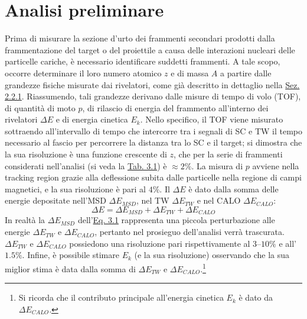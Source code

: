 \documentclass[12pt,a4paper,twoside]{report}
\begin{document}
	\section{Analisi preliminare}\label{sec:fragment_identification}
	Prima di misurare la sezione d'urto dei frammenti secondari prodotti dalla frammentazione del target o del proiettile a causa delle interazioni nucleari delle particelle cariche, è necessario identificare suddetti frammenti. A tale scopo, occorre determinare il loro numero atomico $z$ e di massa $A$ a partire dalle grandezze fisiche misurate dai rivelatori, come già descritto in dettaglio nella \hyperref[sec:setupElettronico]{Sez. 2.2.1}. Riassumendo, tali grandezze derivano dalle misure di tempo di volo (TOF), di quantità di moto $p$, di rilascio di energia del frammento all'interno dei rivelatori $\Delta E$ e di energia cinetica $E_k$. Nello specifico, il TOF viene misurato sottraendo all'intervallo di tempo che intercorre tra i segnali di SC e TW il tempo necessario al fascio per percorrere la distanza tra lo SC e il target; si dimostra che la sua risoluzione è una funzione crescente di $z$, che per la serie di frammenti considerati nell'analisi (si veda la \hyperref[tab:fragments]{Tab. 3.1}) è $\approx2\%$. La misura di $p$ avviene nella tracking region grazie alla deflessione subita dalle particelle nella regione di campi magnetici, e la sua risoluzione è pari al $4\%$. Il $\Delta E$ è dato dalla somma delle energie depositate nell'MSD $\Delta E_{MSD}$, nel TW $\Delta E_{TW}$ e nel CALO $\Delta E_{CALO}$:
	\begin{equation}
		\Delta E=\Delta E_{MSD}+\Delta E_{TW}+\Delta E_{CALO}
		\label{eq:deposited_energy}
	\end{equation}
	In realtà la $\Delta E_{MSD}$ dell'\hyperref[eq:deposited_energy]{Eq. 3.1} rappresenta una piccola perturbazione alle energie $\Delta E_{TW}$ e $\Delta E_{CALO}$, pertanto nel prosieguo dell'analisi verrà trascurata. $\Delta E_{TW}$ e $\Delta E_{CALO}$ possiedono una risoluzione pari rispettivamente al $3$--$10\%$ e all'$1.5\%$. Infine, è possibile stimare $E_k$ (e la sua risoluzione) osservando che la sua miglior stima è data dalla somma di $\Delta E_{TW}$ e $\Delta E_{CALO}$.\footnote{Si ricorda che il contributo principale all'energia cinetica $E_k$ è dato da $\Delta E_{CALO}$.}
	
\end{document}
